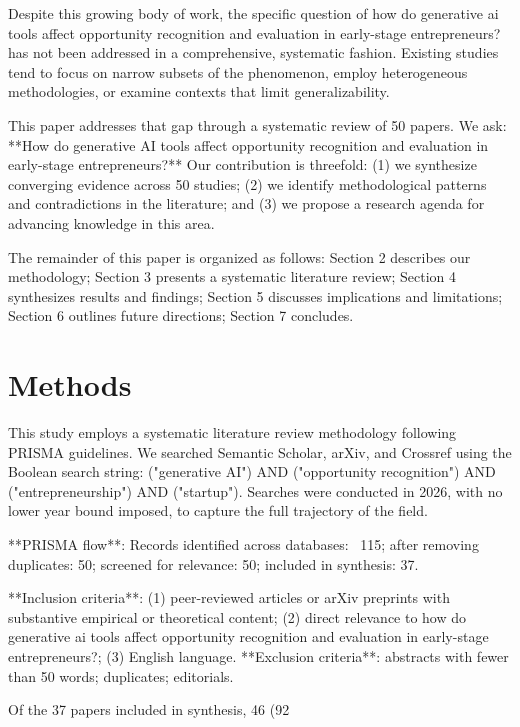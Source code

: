 \documentclass[11pt, a4paper]{article}
\begin{document}
Despite this growing body of work, the specific question of how do generative ai tools affect opportunity recognition and evaluation in early-stage entrepreneurs? has not been addressed in a comprehensive, systematic fashion. Existing studies tend to focus on narrow subsets of the phenomenon, employ heterogeneous methodologies, or examine contexts that limit generalizability.

This paper addresses that gap through a systematic review of 50 papers. We ask: **How do generative AI tools affect opportunity recognition and evaluation in early-stage entrepreneurs?** Our contribution is threefold: (1) we synthesize converging evidence across 50 studies; (2) we identify methodological patterns and contradictions in the literature; and (3) we propose a research agenda for advancing knowledge in this area.

The remainder of this paper is organized as follows: Section 2 describes our methodology; Section 3 presents a systematic literature review; Section 4 synthesizes results and findings; Section 5 discusses implications and limitations; Section 6 outlines future directions; Section 7 concludes.

\section{Methods}
This study employs a systematic literature review methodology following PRISMA guidelines. We searched Semantic Scholar, arXiv, and Crossref using the Boolean search string: ("generative AI") AND ("opportunity recognition") AND ("entrepreneurship") AND ("startup"). Searches were conducted in 2026, with no lower year bound imposed, to capture the full trajectory of the field.

**PRISMA flow**: Records identified across databases: ~115; after removing duplicates: 50; screened for relevance: 50; included in synthesis: 37.

**Inclusion criteria**: (1) peer-reviewed articles or arXiv preprints with substantive empirical or theoretical content; (2) direct relevance to how do generative ai tools affect opportunity recognition and evaluation in early-stage entrepreneurs?; (3) English language. **Exclusion criteria**: abstracts with fewer than 50 words; duplicates; editorials.

Of the 37 papers included in synthesis, 46 (92%
\end{document}
